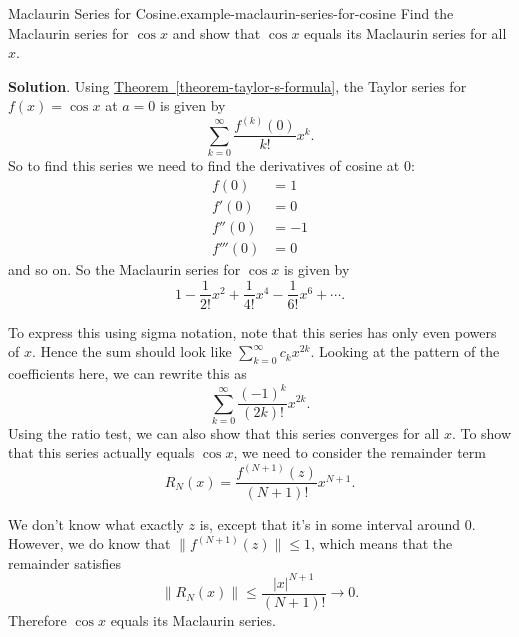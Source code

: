 \documentclass[10pt,]{book}
\numberwithin{equation}{section}
\newcommand{\amp}{&}
\begin{document}
\begin{example}{Maclaurin Series for Cosine.}{example-maclaurin-series-for-cosine}%
\hypertarget{p-971}{}%
Find the Maclaurin series for \(\cos x\) and show that \(\cos x\) equals its Maclaurin series for all \(x\).%
\par\smallskip%
\noindent\textbf{Solution}.\hypertarget{solution-197}{}\quad%
\hypertarget{p-972}{}%
Using \hyperref[theorem-taylor-s-formula]{Theorem~\ref{theorem-taylor-s-formula}}, the Taylor series for \(f(x) = \cos x\) at \(a = 0\) is given by%
\begin{equation*}
\sum_{k=0}^{\infty}\frac{f^{(k)}(0)}{k!}x^{k}\text{.}
\end{equation*}
So to find this series we need to find the derivatives of cosine at \(0\):%
\begin{align*}
f(0) \amp = 1 \\
f'(0) \amp = 0 \\
f''(0) \amp = -1 \\
f'''(0) \amp = 0 
\end{align*}
and so on. So the Maclaurin series for \(\cos x\) is given by%
\begin{equation*}
1 - \frac{1}{2!}x^{2} + \frac{1}{4!}x^{4} - \frac{1}{6!}x^{6} + \cdots\text{.}
\end{equation*}
%
\par
\hypertarget{p-973}{}%
To express this using sigma notation, note that this series has only even powers of \(x\). Hence the sum should look like \(\sum_{k=0}^{\infty}c_{k}x^{2k}\). Looking at the pattern of the coefficients here, we can rewrite this as%
\begin{equation*}
\sum_{k=0}^{\infty}\frac{(-1)^{k}}{(2k)!}x^{2k}\text{.}
\end{equation*}
Using the ratio test, we can also show that this series converges for all \(x\). To show that this series actually equals \(\cos x\), we need to consider the remainder term%
\begin{equation*}
R_{N}(x) = \frac{f^{(N+1)}(z)}{(N+1)!}x^{N+1}\text{.}
\end{equation*}
%
\par
\hypertarget{p-974}{}%
We don't know what exactly \(z\) is, except that it's in some interval around \(0\). However, we do know that \(\|f^{(N+1)}(z)\|\leq 1\), which means that the remainder satisfies%
\begin{equation*}
\|R_{N}(x)\| \leq \frac{|x|^{N+1}}{(N+1)!}\to0\text{.}
\end{equation*}
Therefore \(\cos x\) equals its Maclaurin series.%
\end{example}
\end{document}
